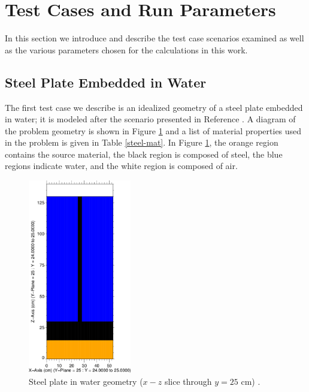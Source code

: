 \documentclass{article} %
\begin{document}
\section{Test Cases and Run Parameters}

In this section we introduce and describe the test case scenarios examined as
well as the various parameters chosen for the calculations in this work. 

\subsection{Steel Plate Embedded in Water}
\label{sec:steel_params}

The first test case we describe is an idealized geometry of a steel plate 
embedded in water; it is modeled after the scenario presented in Reference 
\cite{wilsonslaybaugh}. 
A diagram of the problem geometry is shown in Figure \ref{steelxz} and a list
of material properties used in the problem is given in Table \ref{steel-mat}.
In Figure \ref{steelxz}, the orange region contains the source material, the 
black region is composed of steel, the blue regions indicate water, and the 
white region is composed of air.

\begin{figure}[!htb]
\centering
\includegraphics[width=0.4\textwidth]{img/steel-xz.png}
\caption{Steel plate in water geometry ($x-z$ slice through $y = 25$ cm) 
         \cite{wilsonslaybaugh}.}
\label{steelxz}
\end{figure}
\end{document}
